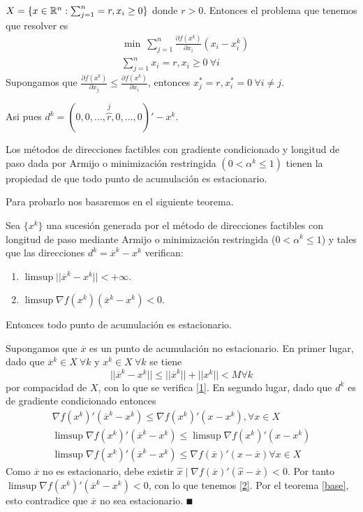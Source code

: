 \documentclass[MIOP.tex]{subfiles}
\begin{document}
\begin{ej}
$X=\{x\in\mathbb{R}^n:\sum_{j=1}^n=r, x_i\geq 0\}$ donde $r>0$. Entonces  el problema que tenemos que resolver es
\begin{align*}
&\min\  \sum_{j=1}^n\frac{\partial f(x^k)}{\partial x_i}(x_i-x^k_i)\\
&\sum_{j=1}^nx_i=r, x_i\geq 0\ \forall i								
\end{align*}
Supongamos que $\frac{\partial f(x^k)}{\partial x_j}\leq\frac{\partial f(x^k)}{\partial x_i}$, entonces $x^*_j=r, x^*_i=0\ \forall i\neq j$.

Asi pues $d^k=(0,0,\dots, \overbrace{r}^j, 0,\dots, 0)'-x^k$. 
\end{ej}

\begin{teorema}\label{teorema}
Los métodos de direcciones factibles con gradiente condicionado y longitud de paso dada por Armijo o minimización restringida $(0<\alpha^k\leq 1)$ tienen la propiedad de que todo punto de acumulación es estacionario. 
\end{teorema}

Para probarlo nos basaremos en el siguiente teorema. 

\begin{teorema}[base]\label{base}
Sea $\{x^k\}$ una sucesión generada por el método de direcciones factibles con longitud de paso mediante Armijo o minimización restringida ($0<\alpha^k\leq 1$) y tales que las direcciones $d^k=\overline{x}^k-x^k$ verifican:
\begin{enumerate}
\item\label{1} $\limsup||\overline{x}^k-x^k||<+\infty$.
\item\label{2} $\limsup \nabla f(x^k)(\overline{x}^k-x^k)<0$.
\end{enumerate}
Entonces todo punto de acumulación es estacionario.
\end{teorema}
\begin{dem} 
Supongamos que $\overline{x}$ es un punto de acumulación no estacionario. En primer lugar, dado que $\overline{x}^k\in X\ \forall k$ y $x^k\in X\ \forall k$ se tiene
$$||\overline{x}^k-x^k||\leq ||\overline{x}^k||+||x^k||<M \forall k$$
por compacidad de $X$, con lo que se verifica \ref{1}. En segundo lugar, dado que $d^k$ es de gradiente condicionado entonces
\begin{gather*}
\nabla f(x^k)'(\overline{x}^k-x^k)\leq \nabla f(x^k)'(x-x^k), \forall x\in X\\
\limsup \nabla f(x^k)'(\overline{x}^k-x^k)\leq \limsup\nabla f(x^k)'(x-x^k)\\
\limsup \nabla f(x^k)'(\overline{x}^k-x^k)\leq\nabla f(\overline{x})'(x-\overline{x}) \forall x\in X
\end{gather*}
Como $\overline{x}$ no es estacionario, debe existir $\hat{x}\mid \nabla f(\overline{x})'(\hat{x}-\overline{x})<0$. Por tanto $\limsup \nabla f(x^k)'(\overline{x}^k-x^k)<0$, con lo que tenemos \ref{2}. Por el teorema \ref{base}, esto contradice que $\overline{x}$ no sea estacionario. $\QED$
\end{dem}
\end{document}

